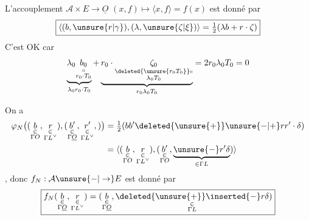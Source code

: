 
L'accouplement $\mathcal A\times E\longrightarrow\underline O$ \quad $(x,f)\longmapsto\langle x,f\rangle=f(x)$ est donné par
\[
\boxed{\langle(b,\unsure{r|\gamma}),(\lambda,\unsure{\zeta|\xi})\rangle=\tfrac12(\lambda b+r\cdot\zeta)}
\]
C'est OK car
\[
\underbrace{\lambda_0\underset{\substack{\shortparallel\\r_0\cdot T_0}}{b_0}}_{\lambda_0r_0\cdot T_0}+\underbrace{r_0\cdot\underset{\substack{\deleted{\unsure{r_0T_0}}\shortparallel\\\lambda_0T_0}}{\zeta_0}}_{r_0\lambda_0T_0}=2r_0\lambda_0T_0=0
\]

On a
\[
\begin{aligned}\varphi_N\big((\underset{\substack{\in\\\Gamma O}}b,\underset{\substack{\in\\\Gamma L^\vee}}r),(\underset{\substack{\in\\\Gamma\underline O}}{b'},\underset{\substack{\in\\\Gamma L^\vee}}{r'},)\big)&=\tfrac12(bb'\deleted{\unsure{+}}\unsure{-|+}rr'\cdot\delta)\\ &=\langle(\underset{\substack{\in\\\Gamma O}}b,\underset{\substack{\in\\\Gamma L^\vee}}r),(\underset{\substack{\in\\\Gamma O}}{b'},\underbrace{\unsure{-}r'\delta}_{\in\Gamma L})\rangle\end{aligned}
\]
, donc
$f_N:\mathcal A\unsure{\mathbin{-}|\to}E$ est donné par
\[
\boxed{f_N(\underset{\substack{\in\\\Gamma\underline O}}b,\underset{\substack{\in\\\Gamma L^\vee}}r)=(\underset{\substack{\in\\\Gamma\underline O}}b,\underset{\substack{\in\\\Gamma L}}{\deleted{\unsure{+}}\inserted{-}r\delta})}
\]

